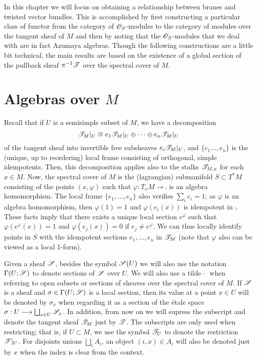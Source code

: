 
\vspace{250pt}

In this chapter we will focus on obtaining a relationship between branes and twisted vector bundles. This is accomplished by first constructing a particular class of functor from the category of $\mathscr{O}_S$-modules to the category of modules over the tangent sheaf of $M$ and then by noting that the $\mathscr{O}_S$-modules that we deal with are in fact Azumaya algebras. Though the following constructions are a little bit technical, the main results are based on the existence of a global section of the pullback sheaf $\pi^{-1}\mathscr{T}$ over the spectral cover of $M$.


\section{Algebras over $M$}\label{algebras_over_m}

Recall that if $U$ is a semisimple subset of $M$, we have a decomposition
$$\mathscr{T}_M|_U\cong e_1\mathscr{T}_M|_U\oplus \cdots \oplus e_n\mathscr{T}_M|_U$$
of the tangent sheaf into invertible free subsheaves $e_i\mathscr{T}_M|_U$, and $\{e_1\dots ,e_n\}$ is the (unique, up to reordering) local frame consisting of orthogonal, simple idempotents. Then, this decomposition applies also to the stalks $\mathscr{T}_{M,x}$ for each $x\in M$. Now, the spectral cover of $M$ is the (lagrangian) submanifold $S\subset T^*M$ consisting of the points $(x,\varphi )$ such that $\varphi :T_xM\rightarrow \comp$ is an algebra homomorphism. The local frame $\{e_1,\dots ,e_n\}$ also verifies $\sum_ie_i=1$; as $\varphi$ is an algebra homomorphism, then $\varphi (1)=1$ and $\varphi (e_i(x))$ is idempotent in $\comp$. These facts imply that there exists a unique local section $e^{\varphi}$ such that $\varphi (e^{\varphi}(x))=1$ and $\varphi (e_j(x))=0$ if $e_j\neq e^{\varphi}$. We can thus locally identify points in $S$ with the idempotent sections $e_1,\dots ,e_n$ in $\mathscr{T}_M$ (note that $\varphi$ also can be viewed as a local 1-form).

\begin{notation}
Given a sheaf $\mathscr{S}$, besides the symbol $\mathscr{S}(U)$ we will also use the notation $\Gamma (U;\mathscr{S})$ to denote sections of $\mathscr{S}$ over $U$. We will also use a tilde $\; \widetilde{} \; $ when referring to open subsets or sections of sheaves over the spectral cover of $M$. If $\mathscr{S}$ is a sheaf and $\sigma \in \Gamma (U;\mathscr{S})$ is a local section, then its value at a point $x\in U$ will be denoted by $\sigma_x$ when regarding it as a section of the \'etale space $\sigma :U\longrightarrow \bigsqcup_{x\in U}\mathscr{S}_x$.
In addition, from now on we will supress the subscript and denote the tangent sheaf $\mathscr{T}_M$ just by $\mathscr{T}$. The subscripts are only used when restricting; that is, if $U\subset M$, we use the symbol $\mathscr{T}_U$ to denote the restriction $\mathscr{T}|_U$. For disjoints unions $\bigsqcup_iA_i$, an object $(i,x)\in A_i$ will also be denoted just by $x$ when the index is clear from the context.
\end{notation}

